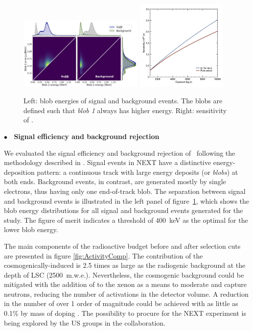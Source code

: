 \begin{figure}
\centering
\includegraphics[width=0.55\textwidth]{img2/BlobComparison.jpg}
\includegraphics[width=0.40\textwidth]{img2/sensitivity_nexthd_lsc.jpg}
\caption{Left: blob energies of signal and background events. The blobs are defined such that \emph{blob 1} always has higher energy. Right: sensitivity of \NHD.}
\label{fig:blobs}
\end{figure}

{\bf $\bullet$~ Signal efficiency and background rejection}
\label{sec:SimulationAndAnalysis}

We evaluated the signal efficiency and background rejection of \NHD\ following the methodology described in \cite{Martin-Albo:2015rhw, NEXT:2020amj}. Signal events in NEXT have a distinctive energy-deposition pattern: a continuous track with large energy deposits (or \emph{blobs}) at both ends. Background events, in contrast, are generated mostly by single electrons, thus having only one end-of-track blob. The separation between signal and background events is illustrated in the left panel of figure~\ref{fig:blobs}, which shows the blob energy distributions for all signal and background events generated for the study. The figure of merit indicates a threshold of \SI{400}{\kilo\eV} as the optimal for the lower blob energy.


The main components of the radioactive budget before and after selection cuts are presented in figure \ref{fig:ActivityComp}. The contribution of the cosmogenically-induced  is 2.5 times as large as the radiogenic background at the depth of LSC (2500~m.w.e.). Nevertheless, the cosmogenic background could be mitigated with the addition of  to the xenon as a means to moderate and capture neutrons, reducing the number of activations in the detector volume. A reduction in the number  of over 1 order of magnitude could be achieved with as little as 0.1\% by mass of  doping \cite{rogers2020mitigation}. The possibility to procure  for the NEXT experiment is being explored by the US groups in the collaboration. 

